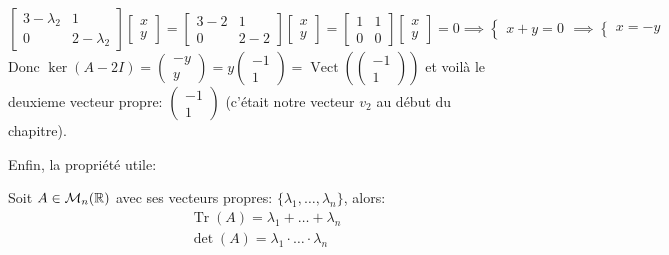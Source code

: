 \begin{eg}
   \[
       \begin{bmatrix} 3 - \lambda_2 & 1 \\ 0 & 2 - \lambda_2 \end{bmatrix}\begin{bmatrix} x \\ y \end{bmatrix} = \begin{bmatrix} 3 - 2 & 1 \\ 0 & 2 - 2 \end{bmatrix}\begin{bmatrix} x \\ y \end{bmatrix} = \begin{bmatrix} 1 & 1 \\ 0 & 0 \end{bmatrix}\begin{bmatrix} x \\ y \end{bmatrix} = 0 
       \implies \begin{cases}
           x + y = 0
       \end{cases} \implies \begin{cases}
           x = -y
       \end{cases}
   \] 
   Donc $\ker(A - 2I) = \begin{pmatrix} -y \\ y \end{pmatrix} = y \begin{pmatrix} -1 \\ 1 \end{pmatrix} = \operatorname{Vect}(\begin{pmatrix} -1 \\ 1 \end{pmatrix} )  $ et voilà le deuxieme vecteur propre: $\begin{pmatrix} -1 \\ 1 \end{pmatrix} $ (c'était notre vecteur $v_2$ au début du chapitre).
\end{eg}

Enfin, la propriété utile:
\begin{prop}
    Soit $A \in \mathcal{M}_n(\mathbb{R})$ avec ses vecteurs propres: $\{\lambda_1, \ldots, \lambda_n\}$, alors:
    \begin{align*}
        &\operatorname{Tr}(A) = \lambda_1 + \ldots + \lambda_n\\
        &\operatorname{det}(A) = \lambda_1 \cdot  \ldots \cdot  \lambda_n\\
    \end{align*}
\end{prop}


